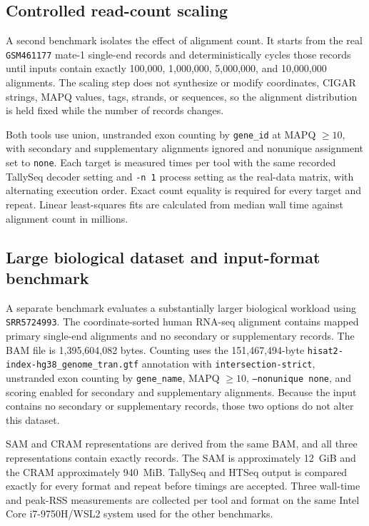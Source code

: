 \documentclass[11pt]{article}
\begin{document}
\subsection{Controlled read-count scaling}

A second benchmark isolates the effect of alignment count. It starts from the real \texttt{GSM461177} mate-1 single-end records and deterministically cycles those records until inputs contain exactly 100,000, 1,000,000, 5,000,000, and 10,000,000 alignments. The scaling step does not synthesize or modify coordinates, CIGAR strings, MAPQ values, tags, strands, or sequences, so the alignment distribution is held fixed while the number of records changes.

Both tools use union, unstranded exon counting by \texttt{gene\_id} at MAPQ $\geq 10$, with secondary and supplementary alignments ignored and nonunique assignment set to \texttt{none}. Each target is measured \ScalingRepeats{} times per tool with the same recorded TallySeq decoder setting and \texttt{-n 1} process setting as the real-data matrix, with alternating execution order. Exact count equality is required for every target and repeat. Linear least-squares fits are calculated from median wall time against alignment count in millions.


\subsection{Large biological dataset and input-format benchmark}

A separate benchmark evaluates a substantially larger biological workload using \texttt{SRR5724993}. The coordinate-sorted human RNA-seq alignment contains \LargeAlignmentCount{} mapped primary single-end alignments and no secondary or supplementary records. The BAM file is 1,395,604,082 bytes. Counting uses the 151,467,494-byte \texttt{hisat2-index-hg38\_genome\_tran.gtf} annotation with \texttt{intersection-strict}, unstranded exon counting by \texttt{gene\_name}, MAPQ $\geq 10$, \texttt{--nonunique none}, and scoring enabled for secondary and supplementary alignments. Because the input contains no secondary or supplementary records, those two options do not alter this dataset.

SAM and CRAM representations are derived from the same BAM, and all three representations contain exactly \LargeAlignmentCount{} records. The SAM is approximately 12~GiB and the CRAM approximately 940~MiB. TallySeq and HTSeq output is compared exactly for every format and repeat before timings are accepted. Three wall-time and peak-RSS measurements are collected per tool and format on the same Intel Core i7-9750H/WSL2 system used for the other benchmarks.
\end{document}

